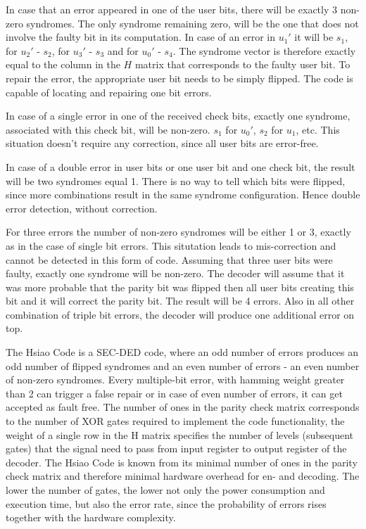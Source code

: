 In case that an error appeared in one of the user bits, there will be exactly 3 non-zero syndromes. The only syndrome remaining zero, will be the one that does not involve the faulty bit in its computation. In case of an error in $u_1'$ it will be $s_1$, for $u_2'$ - $s_2$, for $u_3'$ - $s_3$ and for $u_0'$ - $s_4$. The syndrome vector is therefore exactly equal to the column in the $H$ matrix that corresponds to the faulty user bit. To repair the error, the appropriate user bit needs to be simply flipped. The code is capable of locating and repairing one bit errors.

In case of a single error in one of the received check bits, exactly one syndrome, associated with this check bit, will be non-zero. $s_1$ for $u_0'$, $s_2$ for $u_1$, etc. This situation doesn't require any correction, since all user bits are error-free. 

In case of a double error in user bits or one user bit and one check bit, the result will be two syndromes equal 1. There is no way to tell which bits were flipped, since more combinations result in the same syndrome configuration. Hence double error detection, without correction.

For three errors the number of non-zero syndromes will be either 1 or 3, exactly as in the case of single bit errors. This situtation leads to mis-correction and cannot be detected in this form of code. Assuming that three user bits were faulty, exactly one syndrome will be non-zero. The decoder will assume that it was more probable that the parity bit was flipped then all user bits creating this bit and it will correct the parity bit. The result will be 4 errors. Also in all other combination of triple bit errors, the decoder will produce one additional error on top.

The Hsiao Code is a SEC-DED code, where an odd number of errors produces an odd number of flipped syndromes and an even number of errors - an even number of non-zero syndromes. Every multiple-bit error, with hamming weight greater than 2 can trigger a false repair or in case of even number of errors, it can get accepted as fault free. The number of ones in the parity check matrix corresponds to the number of XOR gates required to implement the code functionality, the weight of a single row in the H matrix specifies the number of levels (subsequent gates) that the signal need to pass from input register to output register of the decoder. The Hsiao Code is known from its minimal number of ones in the parity check matrix and therefore minimal hardware overhead for en- and decoding. The lower the number of gates, the lower not only the power consumption and execution time, but also the error rate, since the probability of errors rises together with the hardware complexity.

